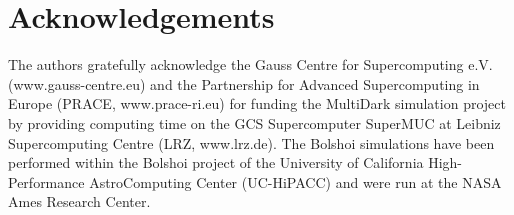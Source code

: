 \documentclass[usenatbib,usegraphicx,letterpaper]{mn2e}
\begin{document}
\section{Acknowledgements}
\label{section:acknowledgements}

The authors gratefully acknowledge the Gauss Centre for Supercomputing e.V. (www.gauss-centre.eu) and the Partnership for Advanced Supercomputing in Europe (PRACE, www.prace-ri.eu) for funding the MultiDark simulation project by providing computing time on the GCS Supercomputer SuperMUC at Leibniz Supercomputing Centre (LRZ, www.lrz.de). The Bolshoi simulations have been performed within the Bolshoi project of the University of California High-Performance AstroComputing Center (UC-HiPACC) and were run at the NASA Ames Research Center.




\end{document}
